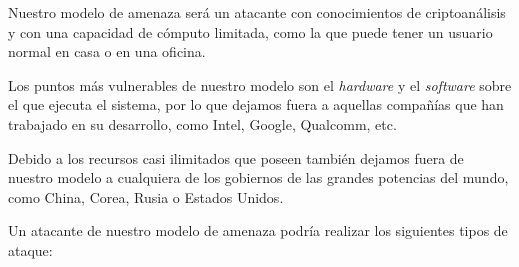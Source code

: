 Nuestro modelo de amenaza será un atacante con conocimientos de criptoanálisis y con una capacidad de cómputo limitada, como la que puede tener un usuario normal en casa o en una oficina.

Los puntos más vulnerables de nuestro modelo son el \emph{hardware} y el \emph{software} sobre el que ejecuta el sistema, por lo que dejamos fuera a aquellas compañías que han trabajado en su desarrollo, como Intel, Google, Qualcomm, etc.

Debido a los recursos casi ilimitados que poseen también dejamos fuera de nuestro modelo a cualquiera de los gobiernos de las grandes potencias del mundo, como China, Corea, Rusia o Estados Unidos.

Un atacante de nuestro modelo de amenaza podría realizar los siguientes tipos de ataque:

